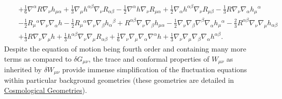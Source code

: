 \documentclass[10pt,letterpaper]{article}
\numberwithin{equation}{section}
\begin{document}
\begin{eqnarray}
&& + \tfrac{1}{6} \nabla^{\alpha }R \nabla_{\nu }h_{\mu \alpha } + \tfrac{1}{3} \nabla_{\mu }h^{\alpha \beta } \nabla_{\nu }R_{\alpha \beta } -  \tfrac{1}{2} \nabla^{\alpha }h \nabla_{\nu }R_{\mu \alpha } + \tfrac{1}{2} \nabla_{\alpha }h^{\alpha \beta } \nabla_{\nu }R_{\mu \beta } -  \tfrac{1}{3} R \nabla_{\nu }\nabla_{\alpha }h_{\mu }{}^{\alpha } \nonumber \\ 
&& -  \tfrac{1}{2} R_{\mu }{}^{\alpha } \nabla_{\nu }\nabla_{\alpha }h -  \tfrac{1}{2} R_{\mu }{}^{\alpha } \nabla_{\nu }\nabla_{\beta }h_{\alpha }{}^{\beta } + R^{\alpha \beta } \nabla_{\nu }\nabla_{\beta }h_{\mu \alpha } -  \tfrac{1}{2} \nabla_{\nu }\nabla_{\beta }\nabla^{\beta }\nabla_{\alpha }h_{\mu }{}^{\alpha } -  \tfrac{2}{3} R^{\alpha \beta } \nabla_{\nu }\nabla_{\mu }h_{\alpha \beta } \nonumber \\ 
&& + \tfrac{1}{3} R \nabla_{\nu }\nabla_{\mu }h + \tfrac{1}{3} h^{\alpha \beta } \nabla_{\nu }\nabla_{\mu }R_{\alpha \beta } + \tfrac{1}{6} \nabla_{\nu }\nabla_{\mu }\nabla_{\alpha }\nabla^{\alpha }h + \tfrac{1}{3} \nabla_{\nu }\nabla_{\mu }\nabla_{\beta }\nabla_{\alpha }h^{\alpha \beta }.
\label{dWgen}
\end{eqnarray}
Despite the equation of motion being fourth order and containing many more terms as compared to $\delta G_{\mu\nu}$, the trace and conformal properties of $W_{\mu\nu}$ as inherited by $\delta W_{\mu\nu}$ provide immense simplification of the fluctuation equations within particular background geometries (these geometries are detailed in \hyperref[sec:Cosmological Geometries]{Cosmological Geometries}). 
\end{document}
